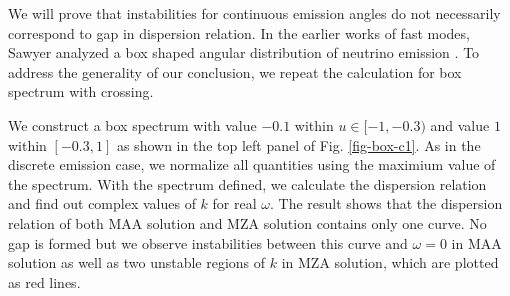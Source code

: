 We will prove that instabilities for continuous emission angles do not necessarily correspond to gap in dispersion relation. In the earlier works of fast modes, Sawyer analyzed a box shaped angular distribution of neutrino emission \cite{Sawyer2016}. To address the generality of our conclusion, we repeat the calculation for box spectrum with crossing.

We construct a box spectrum with value $-0.1$ within $u\in [-1,-0.3)$ and value $1$ within $[-0.3,1]$ as shown in the top left panel of Fig. \ref{fig-box-c1}. As in the discrete emission case, we normalize all quantities using the maximium value of the spectrum. With the spectrum defined, we calculate the dispersion relation and find out complex values of $k$ for real $\omega$. The result shows that the dispersion relation of both MAA solution and MZA solution contains only one curve. No gap is formed but we observe instabilities between this curve and $\omega=0$ in MAA solution as well as two unstable regions of $k$ in MZA solution, which are plotted as red lines.


